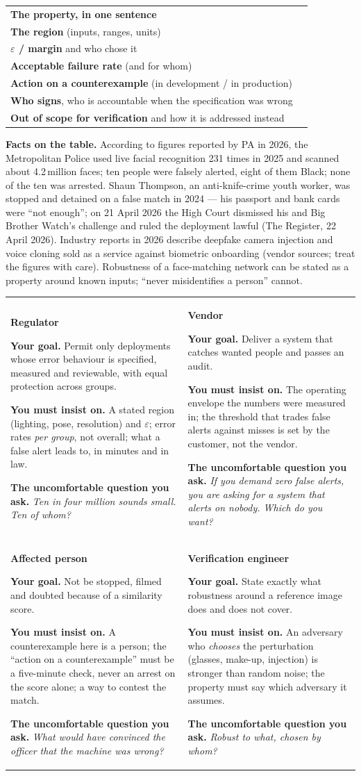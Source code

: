 \documentclass[11pt]{article}
\makeatletter
\newcommand{\rolecard}[4]{%
\begin{tcolorbox}[enhanced,colback=white,colframe=bpInk,boxrule=0.6pt,arc=0pt,left=2mm,right=2mm,top=1.5mm,bottom=1.5mm,height=6.1cm,fontupper=\footnotesize,borderline={0.4pt}{-1.4mm}{bpRule,dashed},
  overlay={\node[anchor=north east,inner sep=1.2mm,font=\bpmono\tiny,text=bpGraphite] at (frame.north east) {ROLE CARD \quad \faCut\ CUT ALONG THE DASHED LINE};}]
{\bpdisplay\bfseries\normalsize\color{bpInk}#1\par}\vspace{1mm}
\textbf{Your goal.} #2\par\vspace{1mm}
\textbf{You must insist on.} #3\par\vspace{1mm}
\textbf{The uncomfortable question you ask.} \emph{#4}
\end{tcolorbox}}
\newcommand{\decisionsheet}{%
\begin{tcolorbox}[enhanced,colback=bpPaperDark,colframe=bpInk,boxrule=0.6pt,arc=0pt,left=2mm,right=2mm,top=1.5mm,bottom=1.5mm,fontupper=\footnotesize,
  overlay={\node[anchor=north east,inner sep=1.2mm,font=\bpmono\tiny,text=bpGraphite] at (frame.north east) {DECISION SHEET};}]
\begin{tabularx}{\textwidth}{@{}lX@{}}
\textbf{The property, in one sentence} & \rule{0pt}{5mm}\dotfill\\
\textbf{The region} (inputs, ranges, units) & \rule{0pt}{5mm}\dotfill\\
\textbf{$\varepsilon$ / margin} and who chose it & \rule{0pt}{5mm}\dotfill\\
\textbf{Acceptable failure rate} (and for whom) & \rule{0pt}{5mm}\dotfill\\
\textbf{Action on a counterexample} (in development / in production) & \rule{0pt}{5mm}\dotfill\\
\textbf{Who signs}, who is accountable when the specification was wrong & \rule{0pt}{5mm}\dotfill\\
\textbf{Out of scope for verification} and how it is addressed instead & \rule{0pt}{5mm}\dotfill\\
\end{tabularx}
\end{tcolorbox}}
\makeatother
\begin{document}
\vspace{2mm}\decisionsheet
\newpage
\begin{notebox}\footnotesize
\textbf{Facts on the table.} According to figures reported by PA in 2026, the Metropolitan Police used live facial recognition 231 times in 2025 and scanned about 4.2\,million faces; ten people were falsely alerted, eight of them Black; none of the ten was arrested. Shaun Thompson, an anti-knife-crime youth worker, was stopped and detained on a false match in 2024 — his passport and bank cards were ``not enough''; on 21 April 2026 the High Court dismissed his and Big Brother Watch's challenge and ruled the deployment lawful (The Register, 22 April 2026). Industry reports in 2026 describe deepfake camera injection and voice cloning sold as a service against biometric onboarding (vendor sources; treat the figures with care). Robustness of a face-matching network can be stated as a property around known inputs; ``never misidentifies a person'' cannot.
\end{notebox}
\begin{tabularx}{\textwidth}{@{}XX@{}}
\rolecard{Regulator}{Permit only deployments whose error behaviour is specified, measured and reviewable, with equal protection across groups.}{A stated region (lighting, pose, resolution) and $\varepsilon$; error rates \emph{per group}, not overall; what a false alert leads to, in minutes and in law.}{Ten in four million sounds small. Ten of whom?} &
\rolecard{Vendor}{Deliver a system that catches wanted people and passes an audit.}{The operating envelope the numbers were measured in; the threshold that trades false alerts against misses is set by the customer, not the vendor.}{If you demand zero false alerts, you are asking for a system that alerts on nobody. Which do you want?}\\[4mm]
\rolecard{Affected person}{Not be stopped, filmed and doubted because of a similarity score.}{A counterexample here is a person; the ``action on a counterexample'' must be a five-minute check, never an arrest on the score alone; a way to contest the match.}{What would have convinced the officer that the machine was wrong?} &
\rolecard{Verification engineer}{State exactly what robustness around a reference image does and does not cover.}{An adversary who \emph{chooses} the perturbation (glasses, make-up, injection) is stronger than random noise; the property must say which adversary it assumes.}{Robust to what, chosen by whom?}\\
\end{tabularx}
\end{document}
